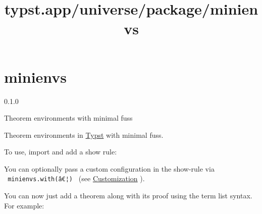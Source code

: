 \title{typst.app/universe/package/minienvs}

\label{banner}
\section{minienvs}\label{minienvs}

{ 0.1.0 }

Theorem environments with minimal fuss

\label{readme}
Theorem environments in \href{https://typst.app/}{Typst} with minimal
fuss.

To use, import and add a show rule:

\begin{Shaded}
\begin{Highlighting}[]
\end{Highlighting}
\end{Shaded}

You can optionally pass a custom configuration in the show-rule via
\texttt{\ minienvs.with(â€¦)\ } (see
\href{https://github.com/typst/packages/raw/main/packages/preview/minienvs/0.1.0/\#customization}{Customization}
).

You can now just add a theorem along with its proof using the term list
syntax. For example:

\begin{Shaded}
\begin{Highlighting}[]




\NormalTok{  $}
\NormalTok{  $}


\end{Highlighting}
\end{Shaded}

